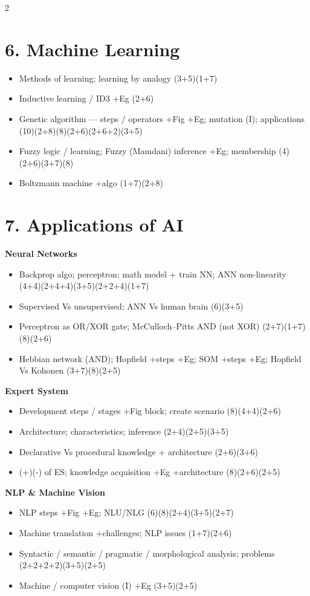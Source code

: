 \documentclass[10pt]{article}
\begin{document}
\begin{multicols}{2}
\section*{6. Machine Learning}
\begin{itemize}
  \item Methods of learning; learning by analogy \hfill (3+5)(1+7)
  \item Inductive learning / ID3 +Eg \hfill (2+6)
  \item Genetic algorithm --- steps / operators +Fig +Eg; mutation (I); applications \hfill (10)(2+8)(8)(2+6)(2+6+2)(3+5)
  \item Fuzzy logic / learning; Fuzzy (Mamdani) inference +Eg; membership \hfill (4)(2+6)(3+7)(8)
  \item Boltzmann machine +algo \hfill (1+7)(2+8)
\end{itemize}

\section*{7. Applications of AI}
\textbf{Neural Networks}
\begin{itemize}
  \item Backprop algo; perceptron; math model + train NN; ANN non-linearity \hfill (4+4)(2+4+4)(3+5)(2+2+4)(1+7)
  \item Supervised Vs unsupervised; ANN Vs human brain \hfill (6)(3+5)
  \item Perceptron as OR/XOR gate; McCulloch--Pitts AND (not XOR) \hfill (2+7)(1+7)(8)(2+6)
  \item Hebbian network (AND); Hopfield +steps +Eg; SOM +steps +Eg; Hopfield Vs Kohonen \hfill (3+7)(8)(2+5)
\end{itemize}
\textbf{Expert System}
\begin{itemize}
  \item Development steps / stages +Fig block; create scenario \hfill (8)(4+4)(2+6)
  \item Architecture; characteristics; inference \hfill (2+4)(2+5)(3+5)
  \item Declarative Vs procedural knowledge + architecture \hfill (2+6)(3+6)
  \item (+)(-) of ES; knowledge acquisition +Eg +architecture \hfill (8)(2+6)(2+5)
\end{itemize}
\textbf{NLP \& Machine Vision}
\begin{itemize}
  \item NLP steps +Fig +Eg; NLU/NLG \hfill (6)(8)(2+4)(3+5)(2+7)
  \item Machine translation +challenges; NLP issues \hfill (1+7)(2+6)
  \item Syntactic / semantic / pragmatic / morphological analysis; problems \hfill (2+2+2+2)(3+5)(2+5)
  \item Machine / computer vision (I) +Eg \hfill (3+5)(2+5)
\end{itemize}

\end{multicols}
\end{document}
